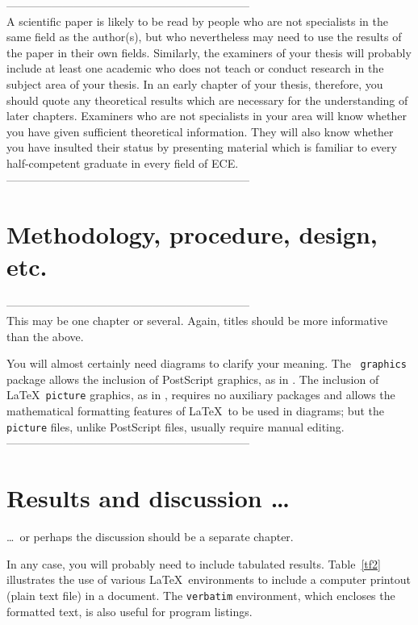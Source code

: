 \documentclass[12pt,openany,a4paper]{book}
\newcommand{\tab}[1]  {Table~\ref{#1}}		%
\begin{document}
-----------------------------------------------------------------\\
A scientific paper is likely to be read by people who are not
specialists in the same field as the author(s), but who nevertheless
may need to use the results of the paper in their own fields.
Similarly, the examiners of your thesis will probably include at least
one academic who does not teach or conduct research in the subject
area of your thesis.  In an early chapter of your thesis, therefore,
you should quote any theoretical results which are necessary for the
understanding of later chapters.  Examiners who are not specialists in
your area will know whether you have given sufficient theoretical
information.  They will also know whether you have insulted their
status by presenting material which is familiar to every
half-competent graduate in every field of ECE.\\
-----------------------------------------------------------------

\chapter{Methodology, procedure, design, etc.}


-----------------------------------------------------------------\\
This may be one chapter or several.  Again, titles should be more
informative than the above.

You will almost certainly need diagrams to clarify your meaning.  The
\LaTeXe\ \texttt{graphics} package allows the inclusion of PostScript
graphics, as in .  The inclusion of \LaTeX\ \texttt{picture}
graphics, as in , requires no auxiliary packages and allows
the mathematical formatting features of \LaTeX\ to be used in
diagrams; but the \texttt{picture} files, unlike PostScript files,
usually require manual editing.\\
-----------------------------------------------------------------\\


\chapter{Results and discussion \ldots}

\ldots\ or perhaps the discussion should be a separate chapter.

In any case, you will probably need to include tabulated results.
\tab{tf2} illustrates the use of various \LaTeX\ environments to
include a computer printout (plain text file) in a document.  The
\texttt{verbatim} environment, which encloses the formatted text, is
also useful for program listings.
\end{document}
